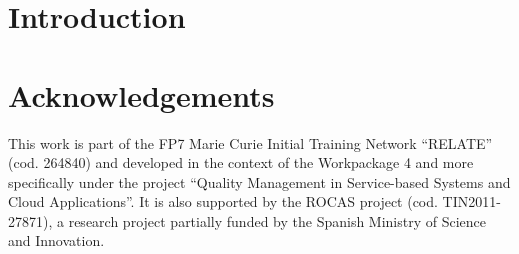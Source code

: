 \documentclass{llncs}
\begin{document}
\section{Introduction}
%
% 
% 

\section{Acknowledgements}
This work is part of the FP7 Marie Curie Initial Training Network ``RELATE'' (cod. 264840) and developed in the context 
of the Workpackage 4 and more specifically under the project ``Quality Management in Service-based Systems and Cloud Applications''. It is 
also supported by the ROCAS project (cod. TIN2011-27871), a research project partially funded by the Spanish Ministry of Science and Innovation.

\clearpage

%

\end{document}
